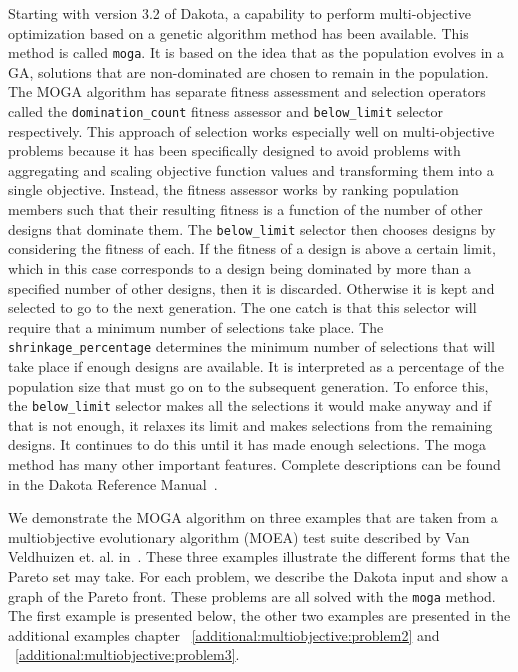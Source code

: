Starting with version 3.2 of Dakota, a capability to perform
multi-objective optimization based on a genetic algorithm method has
been available. This method is called \texttt{moga}. It is based on
the idea that as the population evolves in a GA, solutions that are
non-dominated are chosen to remain in the population. 
The MOGA algorithm has separate fitness assessment and
selection operators called the \texttt{domination\_count} 
fitness assessor and
\texttt{below\_limit} selector respectively. 
This approach of selection works especially
well on multi-objective problems because it has been specifically
designed to avoid problems with aggregating and scaling objective
function values and transforming them into a single
objective. Instead, the fitness assessor works by ranking population
members such that their resulting fitness is a function of the number
of other designs that dominate them. The \texttt{below\_limit} selector then
chooses designs by considering the fitness of each. If the fitness of
a design is above a certain limit, which in this case corresponds to a
design being dominated by more than a specified number of other
designs, then it is discarded. Otherwise it is kept and selected to go
to the next generation. The one catch is that this selector will
require that a minimum number of selections take
place. The \texttt{shrinkage\_percentage} determines the minimum number of
selections that will take place if enough designs are available. It is
interpreted as a percentage of the population size that must go on to
the subsequent generation. To enforce this, the \texttt{below\_limit} selector
makes all the selections it would make anyway and if that is not
enough, it relaxes its limit and makes selections from the remaining
designs. It continues to do this until it has made enough selections.
The moga method has many other important features. Complete
descriptions can be found in the Dakota Reference Manual~\cite{RefMan}.
 
We demonstrate the MOGA algorithm on three examples that are taken 
from a multiobjective
evolutionary algorithm (MOEA) test suite described by Van Veldhuizen
et. al. in~\cite{Coe02}. These three examples
illustrate the different forms that the Pareto set may take. For each
problem, we describe the Dakota input and show a graph of the Pareto
front. These problems are all solved with the \texttt{moga} method.
The first example is presented below, the other two examples are 
presented in the additional examples chapter ~\ref{additional:multiobjective:problem2}
and ~\ref{additional:multiobjective:problem3}.

